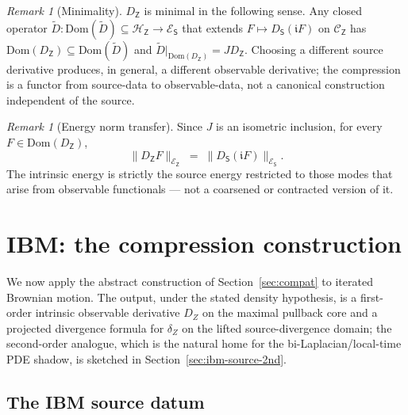 \documentclass[11pt,reqno]{amsart}
\theoremstyle{plain}
\theoremstyle{definition}
\theoremstyle{remark}
\newtheorem{remark}[theorem]{Remark}
\newcommand{\Hilb}{\mathcal{H}}
\newcommand{\Dom}{\mathrm{Dom}}
\newcommand{\Energy}{\mathcal{E}}
\newcommand{\Source}{\mathsf{S}}
\newcommand{\Obs}{\mathsf{Z}}
\renewcommand{\iota}{\mathfrak{i}}
\newcommand{\IBM}{Z}
\begin{document}
\begin{remark}[Minimality]\label{rem:minimality}
$D_\Obs$ is minimal in the following sense. Any closed operator
$\widetilde D\colon\Dom(\widetilde D)\subseteq\Hilb_\Obs\to\Energy_\Source$
that extends $F\mapsto D_\Source(\iota F)$ on $\mathcal C_\Obs$ has
$\Dom(D_\Obs)\subseteq\Dom(\widetilde D)$ and
$\widetilde D|_{\Dom(D_\Obs)}=JD_\Obs$. Choosing a different source
derivative produces, in general, a different observable derivative; the
compression is a functor from source-data to observable-data, not a
canonical construction independent of the source.
\end{remark}

\begin{remark}[Energy norm transfer]\label{rem:energy-norm}
Since $J$ is an isometric inclusion, for every $F\in\Dom(D_\Obs)$,
\[
  \|D_\Obs F\|_{\Energy_\Obs}
  \;=\; \|D_\Source(\iota F)\|_{\Energy_\Source}.
\]
The intrinsic energy is strictly the source energy restricted to those
modes that arise from observable functionals --- not a coarsened or
contracted version of it.
\end{remark}

\section{IBM: the compression construction}\label{sec:ibm-source}

We now apply the abstract construction of Section~\ref{sec:compat} to
iterated Brownian motion. The output, under the stated density
hypothesis, is a first-order intrinsic observable derivative $D_\IBM$
on the maximal pullback core and a projected divergence formula for
$\delta_\IBM$ on the lifted source-divergence domain; the second-order
analogue, which is the natural home for the bi-Laplacian/local-time
PDE shadow, is sketched in Section~\ref{sec:ibm-source-2nd}.

\subsection*{The IBM source datum}
\end{document}
